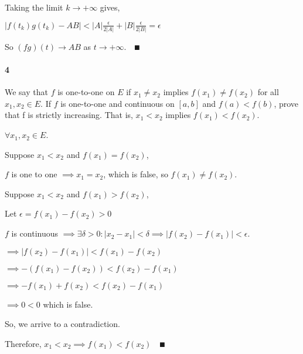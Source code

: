 \documentclass{article}
\begin{document}
Taking the limit $k \rightarrow +\infty$  gives,

$|f(t_k)g(t_k) - AB| < |A|\frac{\epsilon}{2|A|}
+|B|\frac{\epsilon}{2|B|} = \epsilon$

So $(fg)(t) \rightarrow AB$ as $t\rightarrow +\infty.$$\quad ∎$

\paragraph{4} We say that $f$ is one-to-one on $E$ if $x_1  \neq x_2$
implies $f (x_1 )\neq f(x_2 )$ for all $x_1 , x_2 \in E$. If $f$
is one-to-one and continuous on $[a, b]$ and $f (a) < f (b)$, prove that f is strictly increasing.
That is, $x_1 < x_2$ implies $f (x_1) < f (x_2 )$.


$\forall x_1,x_2\in E$.

Suppose $x_1 < x_2$ and $f(x_1) = f(x_2)$,

$f$ is one to one $\implies x_1 = x_2$, which is false, so $f(x_1)\neq
f(x_2).$

Suppose $x_1 < x_2$ and $f(x_1) > f(x_2)$,

Let $\epsilon = f(x_1)-f(x_2) > 0$

$f$ is continuous $\implies \exists \delta >0: |x_2-x_1| < \delta
\implies |f(x_2)-f(x_1)|< \epsilon$.

$\implies |f(x_2) - f(x_1)|< f(x_1) - f(x_2)$

$\implies -(f(x_1) - f(x_2)) < f(x_2) - f(x_1) $

$\implies -f(x_1) + f(x_2) < f(x_2) - f(x_1) $

$\implies 0 < 0$  which is false.

So, we arrive to a contradiction.

Therefore, $x_1 < x_2 \implies f(x_1) < f(x_2)$$\quad ∎$
\end{document}
